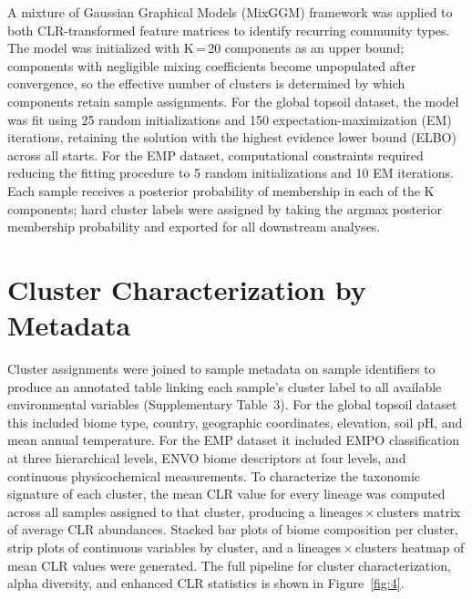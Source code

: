 \documentclass[12pt, oneside]{report}
\begin{document}
A mixture of Gaussian Graphical Models (MixGGM) framework\cite{yooseph2022} was applied to both CLR-transformed feature matrices to identify
recurring community types. The model was initialized with K\,=\,20 components as an upper
bound; components with negligible mixing coefficients become unpopulated after convergence,
so the effective number of clusters is determined by which components retain sample
assignments. For the global topsoil dataset, the model was fit using 25 random initializations
and 150 expectation-maximization (EM) iterations, retaining the solution with the highest
evidence lower bound (ELBO) across all starts. For the EMP dataset, computational constraints
required reducing the fitting procedure to 5 random initializations and 10 EM iterations. Each
sample receives a posterior probability of membership in each of the K components; hard cluster
labels were assigned by taking the argmax posterior membership probability and exported for
all downstream analyses.

\section{Cluster Characterization by Metadata}
\label{sec:cluster-char}

Cluster assignments were joined to sample metadata on sample identifiers to produce an
annotated table linking each sample's cluster label to all available environmental variables
(Supplementary Table~3). For the global topsoil dataset this included biome type, country,
geographic coordinates, elevation, soil pH, and mean annual temperature. For the EMP dataset
it included EMPO classification at three hierarchical levels, ENVO biome descriptors at four
levels, and continuous physicochemical measurements. To characterize the taxonomic signature
of each cluster, the mean CLR value for every lineage was computed across all samples assigned
to that cluster, producing a lineages\,$\times$\,clusters matrix of average CLR abundances.
Stacked bar plots of biome composition per cluster, strip plots of continuous variables by
cluster, and a lineages\,$\times$\,clusters heatmap of mean CLR values were generated. The
full pipeline for cluster characterization, alpha diversity, and enhanced CLR statistics is
shown in Figure~\ref{fig:4}.
\end{document}
